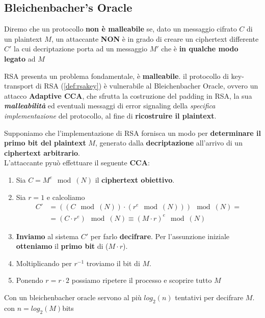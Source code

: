 \subsection{Bleichenbacher's Oracle}
\begin{definition}
Diremo che un protocollo \textbf{non è malleabile} se, dato un messaggio cifrato $C$ di un plaintext $M$, un attaccante \textbf{NON} è in grado di creare un ciphertext differente $C'$ la cui decriptazione porta ad un messaggio $M'$ che è \textbf{in qualche modo legato} ad $M$
\end{definition}
RSA presenta un problema fondamentale, è \textbf{malleabile}. 
il protocollo di key-transport di RSA (\cref{def:rsakey}) è vulnerabile al Bleichenbacher Oracle, ovvero un attacco \textbf{Adaptive CCA}, che sfrutta la costruzione del padding in RSA, la sua \textbf{\textit{malleabilità}} ed eventuali messaggi di error signaling della \textit{specifica implementazione} del protocollo, al fine di \textbf{ricostruire il plaintext}.
\begin{definition}\label{def:bleichenoracle}
Supponiamo che l'implementazione di RSA fornisca un modo per \textbf{determinare il primo bit del plaintext} $M$, generato dalla \textbf{decriptazione} all'arrivo di un \textbf{ciphertext arbitrario}\footnotemark.\\
L'attaccante pyuò effettuare il seguente \textbf{CCA}:
\begin{enumerate}
    \item Sia $C=M^e\mod(N)$ il \textbf{ciphertext obiettivo}.
    \item Sia $r=1$ e calcoliamo 
    \begin{equation*}
        \begin{aligned}
            C'&=((C\mod(N))\cdot(r^e\mod(N)))\mod(N)=\\
            &=(C\cdot r^e)\mod(N)\equiv(M\cdot r)^e\mod(N)
        \end{aligned}
    \end{equation*}
    \item \textbf{Inviamo} al sistema $C'$ per farlo \textbf{decifrare}. Per l'assunzione iniziale \textbf{otteniamo} il \textbf{primo bit} di ($M\cdot r$).\footnotemark
    \item Moltiplicando per $r^{-1}$ troviamo il bit di $M$. 
    \item Ponendo $r=r\cdot2$ possiamo ripetere il processo e scoprire tutto $M$
\end{enumerate}
\end{definition}
\begin{note}
Con un bleichenbacher oracle servono al più $log_2(n)$ tentativi per decifrare $M$. con $n=log_2(M)$bits
\end{note}
